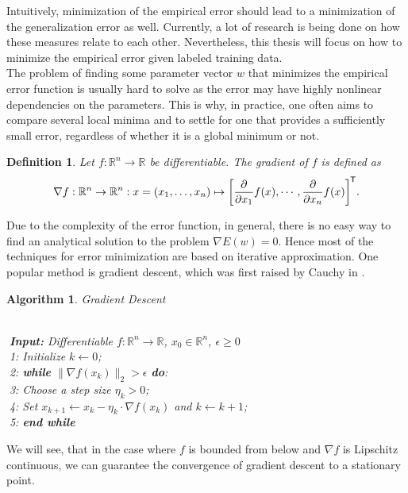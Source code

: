 \documentclass[11pt, a4paper]{article}
\newtheorem{definition}[theorem]{Definition}
\newtheorem{algorithm}[theorem]{Algorithm}
\newcommand{\R}{\mathbb{R}}
\newcommand*{\tr}{^{\mkern-1.5mu\mathsf{T}}}
\begin{document}
Intuitively, minimization of the empirical error should lead to a minimization of the generalization error as well. Currently, a lot of research is being done on how these measures relate to each other. Nevertheless, this thesis will focus on how to minimize the empirical error given labeled training data. \\

The problem of finding some parameter vector $w$ that minimizes the empirical error function is usually hard to solve as the error may have highly nonlinear dependencies on the parameters. This is why, in practice, one often aims to compare several local minima and to settle for one that provides a sufficiently small error, regardless of whether it is a global minimum or not.

\begin{definition}
Let $f: \R^n \to \R$ be differentiable. The gradient of $f$ is defined as
\[ \nabla f : \R^n \to \R^n : x = (x_1, \dots, x_n) \mapsto \bigg [ \frac{\partial}{\partial x_1} f(x), \cdots, \frac{\partial}{\partial x_n} f(x) \bigg ]\tr . \]
\end{definition}

Due to the complexity of the error function, in general, there is no easy way to find an analytical solution to the problem $\nabla E(w) = 0$. Hence most of the techniques for error minimization are based on iterative approximation. One popular method is gradient descent, which was first raised by Cauchy in \cite{GD}.

\begin{algorithm}
\caption{Gradient Descent \textcolor{white}{$\Big |$}} \ \\
\textcolor{white}{$\Big |$}\textbf{Input:} Differentiable $f: \R^n \to \R$, $x_0 \in \R^n$, $\epsilon \geq 0$ \\
\textcolor{white}{$\Big |$}1: Initialize $k \leftarrow 0$; \\
\textcolor{white}{$\Big |$}2: \textbf{while} $ \big \| \nabla f(x_k) \big \|_2 > \epsilon $ \textbf{do}:\\
\textcolor{white}{$\Big |$}3: \quad Choose a step size $\eta_k > 0$; \\
\textcolor{white}{$\Big |$}4: \quad Set $x_{k+1} \leftarrow x_k - \eta_k \cdot \nabla f(x_k)$ and $k \leftarrow k+1$; \\
\textcolor{white}{$\Big |$}5: \textbf{end while}
\end {algorithm}

We will see, that in the case where $f$ is bounded from below and $\nabla f$ is Lipschitz continuous, we can guarantee the  convergence of gradient descent to a stationary point.
\end{document}
